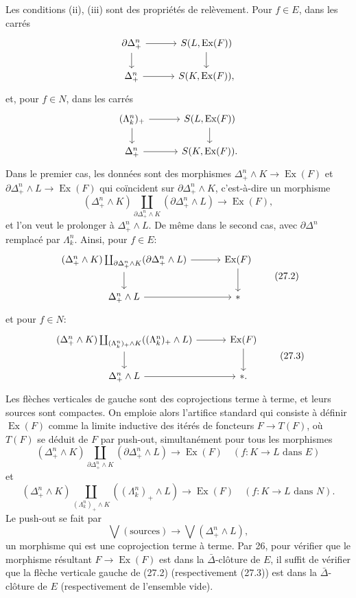 \documentclass[11pt]{article}
\newcommand{\pt}{*}
\theoremstyle{deligne}
\newcommand{\Ex}{\operatorname{Ex}}
\begin{document}
Les conditions (ii), (iii) sont des propriétés de relèvement. Pour \(f\in E\), dans les carrés
\[
\begin{tikzcd}[column sep=3.0em,row sep=1.6em]
\partial\Delta^n_+ \arrow[r] \arrow[d] & S(L,\Ex(F)) \arrow[d] \\
\Delta^n_+ \arrow[r] & S(K,\Ex(F)),
\end{tikzcd}
\]
et, pour \(f\in N\), dans les carrés
\[
\begin{tikzcd}[column sep=3.0em,row sep=1.6em]
(\Lambda^n_k)_+ \arrow[r] \arrow[d] & S(L,\Ex(F)) \arrow[d] \\
\Delta^n_+ \arrow[r] & S(K,\Ex(F)).
\end{tikzcd}
\]
Dans le premier cas, les données sont des morphismes \(\Delta^n_+\wedge K\to\Ex(F)\) et \(\partial\Delta^n_+\wedge L\to\Ex(F)\) qui coïncident sur \(\partial\Delta^n_+\wedge K\), c'est-à-dire un morphisme
\[
(\Delta^n_+\wedge K)\coprod_{\partial\Delta^n_+\wedge K}(\partial\Delta^n_+\wedge L)\longrightarrow \Ex(F),
\]
et l'on veut le prolonger à \(\Delta^n_+\wedge L\). De même dans le second cas, avec \(\partial\Delta^n\) remplacé par \(\Lambda^n_k\). Ainsi, pour \(f\in E\):
\[
\begin{tikzcd}[column sep=3.1em,row sep=1.8em]
(\Delta^n_+\wedge K)\coprod_{\partial\Delta^n_+\wedge K}(\partial\Delta^n_+\wedge L) \arrow[r] \arrow[d] & \Ex(F) \arrow[d] \\
\Delta^n_+\wedge L \arrow[r] & \pt
\end{tikzcd}
\tag{27.2}
\]
et pour \(f\in N\):
\[
\begin{tikzcd}[column sep=3.1em,row sep=1.8em]
(\Delta^n_+\wedge K)\coprod_{(\Lambda^n_k)_+\wedge K}((\Lambda^n_k)_+\wedge L) \arrow[r] \arrow[d] & \Ex(F) \arrow[d] \\
\Delta^n_+\wedge L \arrow[r] & \pt .
\end{tikzcd}
\tag{27.3}
\]
Les flèches verticales de gauche sont des coprojections terme à terme, et leurs sources sont compactes. On emploie alors l'artifice standard qui consiste à définir \(\Ex(F)\) comme la limite inductive des itérés de foncteurs \(F\to T(F)\), où \(T(F)\) se déduit de \(F\) par push-out, simultanément pour tous les morphismes
\[
(\Delta^n_+\wedge K)\coprod_{\partial\Delta^n_+\wedge K}(\partial\Delta^n_+\wedge L)\to \Ex(F)
\quad (f:K\to L\text{ dans }E)
\]
et
\[
(\Delta^n_+\wedge K)\coprod_{(\Lambda^n_k)_+\wedge K}((\Lambda^n_k)_+\wedge L)\to \Ex(F)
\quad (f:K\to L\text{ dans }N).
\]
Le push-out se fait par
\[
\bigvee(\text{sources})\longrightarrow \bigvee(\Delta^n_+\wedge L),
\]
un morphisme qui est une coprojection terme à terme. Par 26, pour vérifier que le morphisme résultant \(F\to\Ex(F)\) est dans la \(\bar\Delta\)-clôture de \(E\), il suffit de vérifier que la flèche verticale gauche de (27.2) (respectivement (27.3)) est dans la \(\bar\Delta\)-clôture de \(E\) (respectivement de l'ensemble vide).
\end{document}
